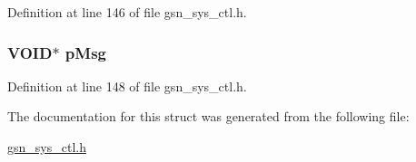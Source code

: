 Definition at line 146 of file gsn\_\-sys\_\-ctl.h.

\hypertarget{a00252_a115621dd56e7c469fd9324a45ae055c0}{
\subsubsection[{pMsg}]{\setlength{\rightskip}{0pt plus 5cm}VOID$\ast$ {\bf pMsg}}}
\label{a00252_a115621dd56e7c469fd9324a45ae055c0}


Definition at line 148 of file gsn\_\-sys\_\-ctl.h.



The documentation for this struct was generated from the following file:\begin{DoxyCompactItemize}
\item 
\hyperlink{a00592}{gsn\_\-sys\_\-ctl.h}\end{DoxyCompactItemize}
